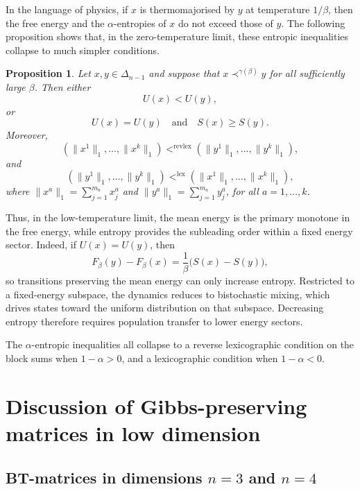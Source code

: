 \documentclass[11pt,a4paper,longbibliography]{amsart}
\numberwithin{equation}{section}
\theoremstyle{plain}
\newtheorem{prop}[thm]{Proposition}
\theoremstyle{definition}
\theoremstyle{remark}
\begin{document}
	In the language of physics, if $x$ is thermomajorised by $y$ at temperature $1/\beta$, then the free energy and the $\alpha$-entropies of $x$ do not exceed those of $y$. The following proposition shows that, in the zero-temperature limit, these entropic inequalities collapse to much simpler conditions.
	\begin{prop}
		\label{prop:fate_monotones}
		Let $x,y\in\Delta_{n-1}$ and suppose that $x\prec^{\gamma(\beta)} y$  for all sufficiently large $\beta$.  Then
		either
		$$
		U(x)<U(y),
		$$
		or
		$$
		U(x)=U(y)
		\quad\text{and}\quad
		S(x)\ge S(y).
		$$
		Moreover, 
		\begin{equation}
			\label{eq:revlex-condition}
			\left(
			\|x^1\|_1,
			\dots,
			\|x^k\|_1
			\right)
			<
			^{\mathrm{revlex}}
			\left(
			\|y^1\|_1,
			\dots,
			\|y^k\|_1
			\right),
		\end{equation}
		and
		\begin{equation}
			\label{eq:lex-condition}
			\left(
			\|y^1\|_1,
			\dots,
			\|y^k\|_1
			\right)
			<
			^{\mathrm{lex}}
			\left(
			\|x^1\|_1,
			\dots,
			\|x^k\|_1
			\right),
		\end{equation} 
		where $\|x^a\|_1=\sum_{j=1}^{m_a}x^a_j$ and $\|y^a\|_1=\sum_{j=1}^{m_a}y^a_j$, for all $a=1,\ldots,k$.
	\end{prop}
	Thus, in the low-temperature limit, the mean energy is the primary monotone in the free energy, while entropy provides the subleading order within a fixed energy sector.
	Indeed, if $U(x)=U(y)$, then
	\begin{equation}
		F_\beta(y)-F_\beta(x)
		=
		\frac1\beta\bigl(S(x)-S(y)\bigr),
	\end{equation}
	so transitions preserving the mean energy can only increase entropy. Restricted to a fixed-energy subspace, the dynamics reduces to bistochastic mixing, which drives states toward the uniform distribution on that subspace. Decreasing entropy therefore requires population transfer to lower energy sectors.
	
	The $\alpha$-entropic inequalities all collapse to a reverse lexicographic condition on the block sums when $1-\alpha>0$, and a lexicographic condition when $1-\alpha<0$.
	
	\section{Discussion of Gibbs-preserving matrices in low dimension} \label{sec:examples}
	
	\subsection{BT-matrices in dimensions $n=3$ and $n=4$}
	
\end{document}
